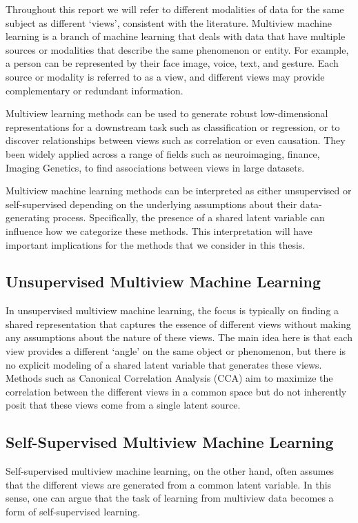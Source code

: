Throughout this report we will refer to different modalities of data for the same subject as different `views', consistent with the literature\cite{sun2013survey}.
Multiview machine learning is a branch of machine learning that deals with data that have multiple sources or modalities that describe the same phenomenon or entity.
For example, a person can be represented by their face image, voice, text, and gesture.
Each source or modality is referred to as a view, and different views may provide complementary or redundant information.

Multiview learning methods can be used to generate robust low-dimensional representations for a downstream task such as classification or regression, or to discover relationships between views such as correlation or even causation.
They been widely applied across a range of fields such as neuroimaging\cite{Krishnan2011}, finance\cite{cassel2000measurement}, Imaging Genetics\cite{Hansen2021}, to find associations between views in large datasets.

Multiview machine learning methods can be interpreted as either unsupervised or self-supervised depending on the underlying assumptions about their data-generating process.
Specifically, the presence of a shared latent variable can influence how we categorize these methods.
This interpretation will have important implications for the methods that we consider in this thesis.

\subsection{Unsupervised Multiview Machine Learning}
In unsupervised multiview machine learning, the focus is typically on finding a shared representation that captures the essence of different views without making any assumptions about the nature of these views.
The main idea here is that each view provides a different `angle' on the same object or phenomenon, but there is no explicit modeling of a shared latent variable that generates these views.
Methods such as Canonical Correlation Analysis (CCA) aim to maximize the correlation between the different views in a
common space but do not inherently posit that these views come from a single latent source.

\subsection{Self-Supervised Multiview Machine Learning}
Self-supervised multiview machine learning, on the other hand, often assumes that the different views are generated from a common latent variable.
In this sense, one can argue that the task of learning from multiview data becomes a form of self-supervised learning.

